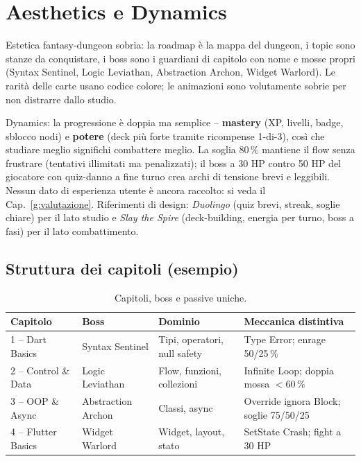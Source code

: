 \chapter{Aesthetics e Dynamics}
\label{g:aesthetics}
Estetica fantasy-dungeon sobria: la roadmap \`e la mappa del dungeon, i
topic sono stanze da conquistare, i boss sono i guardiani di capitolo con
nome e mosse propri (Syntax Sentinel, Logic Leviathan, Abstraction
Archon, Widget Warlord).
Le rarit\`a delle carte usano codice colore; le animazioni sono
volutamente sobrie per non distrarre dallo studio.

Dynamics: la progressione \`e doppia ma semplice -- \textbf{mastery}
(XP, livelli, badge, sblocco nodi) e \textbf{potere} (deck pi\`u forte
tramite ricompense 1-di-3), cos\`i che studiare meglio significhi
combattere meglio. La soglia 80\,\% mantiene il flow senza frustrare
(tentativi illimitati ma penalizzati); il boss a 30 HP contro 50 HP del
giocatore con quiz-danno a fine turno crea archi di tensione brevi e
leggibili. Nessun dato di esperienza utente \`e ancora raccolto: si veda
il Cap.~\ref{g:valutazione}. Riferimenti di design: \textit{Duolingo}
(quiz brevi, streak, soglie chiare) per il lato studio e
\textit{Slay the Spire} (deck-building, energia per turno, boss a fasi)
per il lato combattimento.

\section{Struttura dei capitoli (esempio)}
\begin{table}[ht]
\centering
\footnotesize
\begin{tabularx}{\linewidth}{@{}lXlX@{}}
\toprule
Capitolo & Boss & Dominio & Meccanica distintiva \\
\midrule
1 -- Dart Basics & Syntax Sentinel & Tipi, operatori, null safety & Type Error; enrage 50/25\,\% \\
2 -- Control \& Data & Logic Leviathan & Flow, funzioni, collezioni & Infinite Loop; doppia mossa $<$60\,\% \\
3 -- OOP \& Async & Abstraction Archon & Classi, async & Override ignora Block; soglie 75/50/25 \\
4 -- Flutter Basics & Widget Warlord & Widget, layout, stato & SetState Crash; fight a 30 HP \\
\bottomrule
\end{tabularx}
\caption{Capitoli, boss e passive uniche.}
\label{tab:capitoli}
\end{table}

